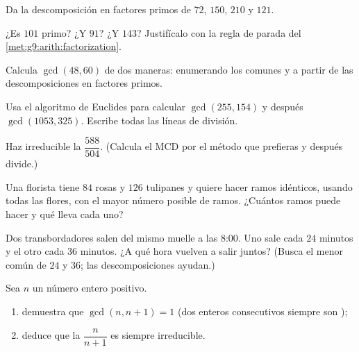 \begin{exercise}[$\star$]\label{exo:g9:arith:3}
Da la descomposición en factores primos de $72$, $150$, $210$ y $121$.
\end{exercise}

\begin{exercise}[$\star$]\label{exo:g9:arith:4}
¿Es $101$ primo? ¿Y $91$? ¿Y $143$? Justifícalo con la regla de parada del
\cref{met:g9:arith:factorization}.
\end{exercise}

\begin{exercise}[$\star$]\label{exo:g9:arith:5}
Calcula $\gcd(48, 60)$ de dos maneras: enumerando los  comunes y a partir de
las descomposiciones en factores primos.
\end{exercise}

\begin{exercise}[$\star\star$]\label{exo:g9:arith:6}
Usa el algoritmo de Euclides para calcular $\gcd(255, 154)$ y después
$\gcd(1053, 325)$. Escribe todas las líneas de división.
\end{exercise}

\begin{exercise}[$\star\star$]\label{exo:g9:arith:7}
Haz irreducible la  $\dfrac{588}{504}$. (Calcula el MCD por el
método que prefieras y después divide.)
\end{exercise}

\begin{exercise}[$\star\star$]\label{exo:g9:arith:8}
Una florista tiene $84$ rosas y $126$ tulipanes y quiere hacer ramos
idénticos, usando todas las flores, con el mayor número posible de ramos.
¿Cuántos ramos puede hacer y qué lleva cada uno?
\end{exercise}

\begin{exercise}[$\star\star$]\label{exo:g9:arith:9}
Dos transbordadores salen del mismo muelle a las 8:00. Uno sale cada $24$ minutos
y el otro cada $36$ minutos. ¿A qué hora vuelven a salir juntos?
(Busca el menor  común de $24$ y $36$; las descomposiciones
ayudan.)
\end{exercise}

\begin{exercise}[$\star\star\star$]\label{exo:g9:arith:10}
Sea $n$ un número entero positivo.
\begin{enumerate}
  \item demuestra que $\gcd(n, n+1) = 1$ (dos enteros consecutivos siempre son
        );
  \item deduce que la  $\dfrac{n}{n+1}$ es siempre irreducible.
\end{enumerate}
\end{exercise}

